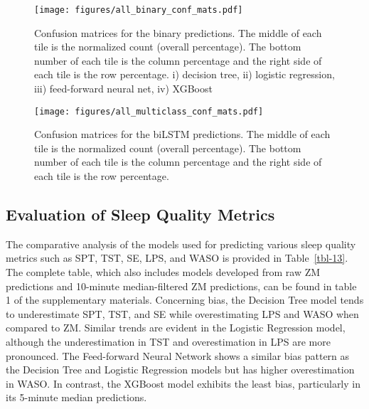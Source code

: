 \documentclass[
  9pt,
]{scrbook}
\begin{document}
\begin{figure}

{\centering \texttt{[image: figures/all\_binary\_conf\_mats.pdf]}

}

\caption{\label{fig-bin_conf_mat}Confusion matrices for the binary
predictions. The middle of each tile is the normalized count (overall
percentage). The bottom number of each tile is the column percentage and
the right side of each tile is the row percentage. i) decision tree, ii)
logistic regression, iii) feed-forward neural net, iv) XGBoost}

\end{figure}

\begin{figure}

{\centering \texttt{[image: figures/all\_multiclass\_conf\_mats.pdf]}

}

\caption{\label{fig-mul_conf_mat}Confusion matrices for the biLSTM
predictions. The middle of each tile is the normalized count (overall
percentage). The bottom number of each tile is the column percentage and
the right side of each tile is the row percentage.}

\end{figure}

\hypertarget{evaluation-of-sleep-quality-metrics}{%
\subsection{Evaluation of Sleep Quality
Metrics}\label{evaluation-of-sleep-quality-metrics}}

The comparative analysis of the models used for predicting various sleep
quality metrics such as SPT, TST, SE, LPS, and WASO is provided in
Table~\ref{tbl-13}. The complete table, which also includes models
developed from raw ZM predictions and 10-minute median-filtered ZM
predictions, can be found in table 1 of the supplementary materials.
Concerning bias, the Decision Tree model tends to underestimate SPT,
TST, and SE while overestimating LPS and WASO when compared to ZM.
Similar trends are evident in the Logistic Regression model, although
the underestimation in TST and overestimation in LPS are more
pronounced. The Feed-forward Neural Network shows a similar bias pattern
as the Decision Tree and Logistic Regression models but has higher
overestimation in WASO. In contrast, the XGBoost model exhibits the
least bias, particularly in its 5-minute median predictions.
\end{document}
